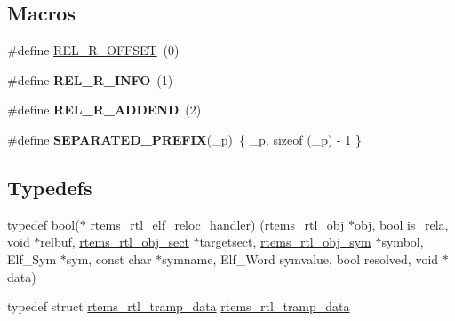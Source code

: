 \subsection*{Macros}
\begin{DoxyCompactItemize}
\item 
\#define \mbox{\hyperlink{rtl-elf_8c_a8809de6f03e511a56892b94bb0ed49dd}{R\+E\+L\+\_\+\+R\+\_\+\+O\+F\+F\+S\+ET}}~(0)
\item 
\mbox{\label{rtl-elf_8c_a439f57647c949873428cde19d81e0216}} 
\#define {\bfseries R\+E\+L\+\_\+\+R\+\_\+\+I\+N\+FO}~(1)
\item 
\mbox{\label{rtl-elf_8c_a032a46e321b9ba0b02ff84228c22679f}} 
\#define {\bfseries R\+E\+L\+\_\+\+R\+\_\+\+A\+D\+D\+E\+ND}~(2)
\item 
\mbox{\label{rtl-elf_8c_ac4e2fc4d2f41e73958f7b8c552b521d1}} 
\#define {\bfseries S\+E\+P\+A\+R\+A\+T\+E\+D\+\_\+\+P\+R\+E\+F\+IX}(\+\_\+p)~\{ \+\_\+p, sizeof (\+\_\+p) -\/ 1 \}
\end{DoxyCompactItemize}
\subsection*{Typedefs}
\begin{DoxyCompactItemize}
\item 
typedef bool($\ast$ \mbox{\hyperlink{rtl-elf_8c_a49100f2820d4b5ab9d71e7a5cc856bd9}{rtems\+\_\+rtl\+\_\+elf\+\_\+reloc\+\_\+handler}}) (\mbox{\hyperlink{structrtems__rtl__obj}{rtems\+\_\+rtl\+\_\+obj}} $\ast$obj, bool is\+\_\+rela, void $\ast$relbuf, \mbox{\hyperlink{structrtems__rtl__obj__sect}{rtems\+\_\+rtl\+\_\+obj\+\_\+sect}} $\ast$targetsect, \mbox{\hyperlink{structrtems__rtl__obj__sym}{rtems\+\_\+rtl\+\_\+obj\+\_\+sym}} $\ast$symbol, Elf\+\_\+\+Sym $\ast$sym, const char $\ast$symname, Elf\+\_\+\+Word symvalue, bool resolved, void $\ast$data)
\item 
typedef struct \mbox{\hyperlink{structrtems__rtl__tramp__data}{rtems\+\_\+rtl\+\_\+tramp\+\_\+data}} \mbox{\hyperlink{rtl-elf_8c_a28bb76c7d71d2cd980d0da6c20795fc7}{rtems\+\_\+rtl\+\_\+tramp\+\_\+data}}
\end{DoxyCompactItemize}
